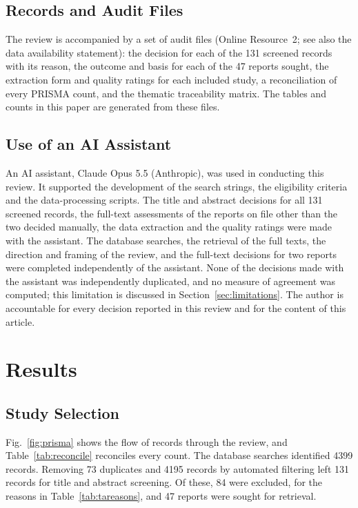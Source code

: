 \documentclass[pdflatex,sn-basic]{sn-jnl}
\begin{document}
\subsection{Records and Audit Files}
\label{sec:audit}

The review is accompanied by a set of audit files (Online Resource~2; see also the data availability statement): the decision for each of the 131 screened records with its reason, the outcome and basis for each of the 47 reports sought, the extraction form and quality ratings for each included study, a reconciliation of every PRISMA count, and the thematic traceability matrix. The tables and counts in this paper are generated from these files.

\subsection{Use of an AI Assistant}\label{sec:ai}

An AI assistant, Claude Opus 5.5 (Anthropic), was used in conducting this review. It supported the development of the search strings, the eligibility criteria and the data-processing scripts. The title and abstract decisions for all 131 screened records, the full-text assessments of the reports on file other than the two decided manually, the data extraction and the quality ratings were made with the assistant. The database searches, the retrieval of the full texts, the direction and framing of the review, and the full-text decisions for two reports were completed independently of the assistant. None of the decisions made with the assistant was independently duplicated, and no measure of agreement was computed; this limitation is discussed in Section~\ref{sec:limitations}. The author is accountable for every decision reported in this review and for the content of this article.

\section{Results}
\label{sec:results}

\subsection{Study Selection}

Fig.~\ref{fig:prisma} shows the flow of records through the review, and Table~\ref{tab:reconcile} reconciles every count. The database searches identified 4399 records. Removing 73 duplicates and 4195 records by automated filtering left 131 records for title and abstract screening. Of these, 84 were excluded, for the reasons in Table~\ref{tab:tareasons}, and 47 reports were sought for retrieval.
\end{document}
